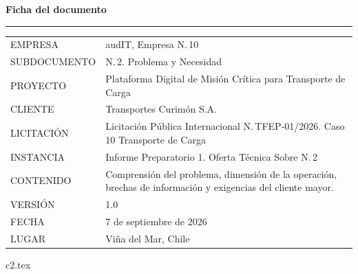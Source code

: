 \documentclass[12pt, letterpaper, table, xcdraw]{inf-pucv}
\begin{document}

\thispagestyle{folioficha}
\vspace*{1.2cm}
{\color{audITnavy}\fontsize{28}{32}\selectfont\bfseries Ficha del documento}

\vspace{10pt}
{\color{audITteal}\rule{\linewidth}{2pt}}

\vspace{22pt}
{\small
\begin{longtable}{@{}p{3.5cm}p{10.5cm}@{}}
\color{audITgris}EMPRESA & \color{black}audIT, Empresa N.\textordmasculine{}\,10 \\
\color{audITgris}SUBDOCUMENTO & \color{black}N.\textordmasculine{}\,2. Problema y Necesidad \\
\color{audITgris}PROYECTO & \color{black}Plataforma Digital de Misión Crítica para Transporte de Carga \\
\color{audITgris}CLIENTE & \color{black}Transportes Curimón S.A. \\
\color{audITgris}LICITACIÓN & \color{black}Licitación Pública Internacional N.\textordmasculine{}\,TFEP-01/2026. Caso 10 Transporte de Carga \\
\color{audITgris}INSTANCIA & \color{black}Informe Preparatorio 1. Oferta Técnica Sobre N.\textordmasculine{}\,2 \\
\color{audITgris}CONTENIDO & \color{black}Comprensión del problema, dimensión de la operación, brechas de información y exigencias del cliente mayor. \\
\color{audITgris}VERSIÓN & \color{black}1.0 \\
\color{audITgris}FECHA & \color{black}7 de septiembre de 2026 \\
\color{audITgris}LUGAR & \color{black}Viña del Mar, Chile \\
\end{longtable}}
\clearpage

\renewcommand{\contentsname}{Índice}
\tableofcontents
\clearpage

{c2.tex}

\clearpage
{}
{}
\printbibliography[title={Bibliografía}]
\end{document}
